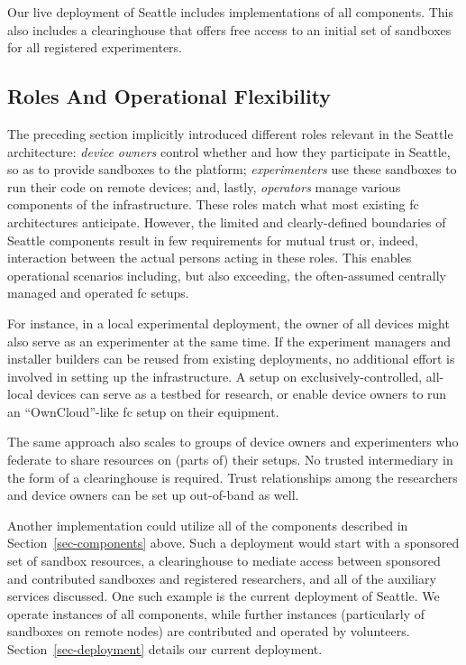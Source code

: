 Our live deployment
of Seattle includes implementations of all components.
This also includes a
clearinghouse that offers free access to an initial set of sandboxes
for all registered experimenters.


\subsection{Roles And Operational Flexibility}\label{sec-op-flex}

The preceding section implicitly introduced different roles relevant
in the Seattle architecture:
\textit{device owners} control whether and how they participate
in Seattle, so as to provide sandboxes to the platform;
\textit{experimenters} use these sandboxes to run their code
on remote devices;
and, lastly, \textit{operators} manage various components
of the infrastructure.
These roles match what most existing \gls{fc} architectures
anticipate.
However, the limited and clearly-defined boundaries of Seattle
components result in few requirements for mutual trust or, indeed,
interaction between
the actual persons acting in these roles. This enables operational
scenarios including, but also exceeding, the often-assumed centrally managed
and operated \gls{fc} setups.

For instance, in a local experimental deployment, the owner of all
devices might also serve as an experimenter at the same time. If
the experiment managers and installer builders can be reused
from existing deployments, no additional effort is involved in
setting up the infrastructure.
A setup on exclusively-controlled, all-local devices can serve as
a testbed for research, or enable device owners to run an
``OwnCloud''-like \gls{fc} setup on their equipment.

The same approach also scales to groups of device owners and experimenters
who federate
to share resources on (parts of) their setups. No trusted
intermediary in the form of a clearinghouse is required.
Trust relationships among the researchers and device owners
can be set up out-of-band as well.

Another implementation could utilize all of the components described
in Section~\ref{sec-components} above.
Such a deployment would start with a sponsored set of sandbox resources,
a clearinghouse to mediate access between sponsored and contributed
sandboxes
and registered researchers, and all of the auxiliary services
discussed. One such example is the current deployment of Seattle. We operate
instances of all components, while further instances
(particularly of sandboxes on remote nodes) are contributed and
operated by volunteers.
Section~\ref{sec-deployment} details our current deployment.


